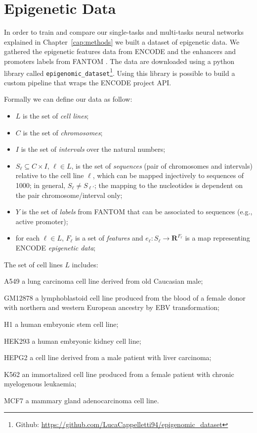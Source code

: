 \section{Epigenetic Data} \label{sec:epigenomic_data}

In order to train and compare our single-tasks and multi-tasks neural networks explained in Chapter~\ref{cap:methods} we built a dataset of epigenetic data. We gathered the epigenetic features data from
ENCODE \cite{ENCODE_data} and the enhancers and promoters labels from FANTOM \cite{FANTOM_data}. The data are downloaded using a python library called \verb|epigenomic_dataset|\footnote{Github: \url{https://github.com/LucaCappelletti94/epigenomic_dataset}}. Using this library is possible to build a custom pipeline that wraps the ENCODE project API. 

Formally we can define our data as follow: 
\begin{itemize}
    \item $L$ is the set of \emph{cell lines};
    \item $C$ is the set of \emph{chromosomes};
    \item $I$ is the set of \emph{intervals} over the natural numbers;
    \item $S_\ell\subseteq C\times I$, $\ell\in L$, is the set of \emph{sequences} (pair of chromosomes and intervals) relative to the cell line $\ell$, which can be mapped injectively to sequences of 1000; in general, $S_\ell\neq S_{\ell'}$; the mapping to the nucleotides is dependent on the pair chromosome/interval only;
    \item $Y$ is the set of \emph{labels} from FANTOM that can be associated to sequences (e.g., active promoter);
    \item for each $\ell\in L$, $F_\ell$ is a set of \emph{features} and $e_\ell:S_\ell\to\mathbf R^{F_\ell}$ is a map representing ENCODE \emph{epigenetic data};
\end{itemize}
The set of cell lines $L$ includes: 
\begin{description} 
\item A549 a lung carcinoma cell line derived from old Caucasian male;
\item GM12878 a lymphoblastoid cell line produced from the blood of a female donor with northern and western European ancestry by EBV transformation;
\item H1 a human embryonic stem cell line; 
\item HEK293 a human embryonic kidney cell line;
\item HEPG2 a cell line derived from a male patient with liver carcinoma;
\item K562 an immortalized cell line produced from a female patient with chronic myelogenous leukaemia;
\item MCF7 a mammary gland adenocarcinoma cell line.
\end{description}
